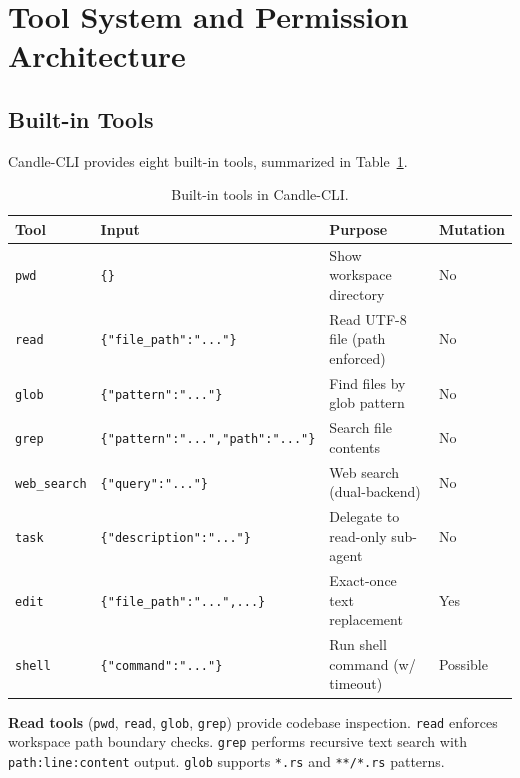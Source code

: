 \documentclass[11pt]{article}
\begin{document}
\section{Tool System and Permission Architecture}
\label{sec:tools}

\subsection{Built-in Tools}

Candle-CLI provides eight built-in tools, summarized in Table~\ref{tab:tools}.

\begin{table}[h]
\centering
\caption{Built-in tools in Candle-CLI.}
\label{tab:tools}
\begin{tabular}{@{}llll@{}}
\toprule
\textbf{Tool} & \textbf{Input} & \textbf{Purpose} & \textbf{Mutation} \\
\midrule
\texttt{pwd}       & \texttt{\{\}}                  & Show workspace directory        & No \\
\texttt{read}      & \texttt{\{"file\_path":"..."\}}  & Read UTF-8 file (path enforced) & No \\
\texttt{glob}      & \texttt{\{"pattern":"..."\}}     & Find files by glob pattern      & No \\
\texttt{grep}      & \texttt{\{"pattern":"...","path":"..."\}} & Search file contents     & No \\
\texttt{web\_search}& \texttt{\{"query":"..."\}}       & Web search (dual-backend)       & No \\
\texttt{task}      & \texttt{\{"description":"..."\}}  & Delegate to read-only sub-agent & No \\
\texttt{edit}      & \texttt{\{"file\_path":"...",...\}}& Exact-once text replacement     & Yes \\
\texttt{shell}     & \texttt{\{"command":"..."\}}      & Run shell command (w/ timeout)  & Possible \\
\bottomrule
\end{tabular}
\end{table}

\textbf{Read tools} (\texttt{pwd}, \texttt{read}, \texttt{glob}, \texttt{grep}) provide codebase inspection. \texttt{read} enforces workspace path boundary checks. \texttt{grep} performs recursive text search with \texttt{path:line:content} output. \texttt{glob} supports \texttt{*.rs} and \texttt{**/*.rs} patterns.
\end{document}
